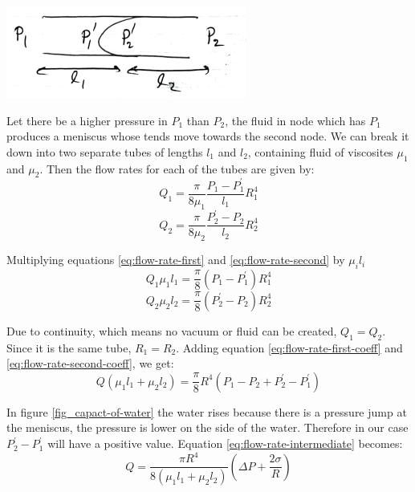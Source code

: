\documentclass[12pt, a4paper]{article}
\begin{document}
\includegraphics{fig_flowr-1-men}

Let there be a higher pressure in $P_{1}$ than $P_{2}$, the fluid in node which has $P_{1}$ produces a meniscus whose tends move towards the second node. We can break it down into two separate tubes of lengths $l_{1}$ and $l_{2}$, containing fluid of viscosites ${\mu}_1$ and ${\mu}_2$. Then the flow rates for each of the tubes are given by:
\begin{equation} \label{eq:flow-rate-first}
Q_1 = \frac{\pi}{8{\mu}_1} \frac{P_1 - P^{'}_1}{l_1} R_1^4
\end{equation}
\begin{equation} \label{eq:flow-rate-second}
Q_2 = \frac{\pi}{8{\mu}_2} \frac{P^{'}_2 - P_2}{l_2} R_2^4
\end{equation}

Multiplying equations \ref{eq:flow-rate-first} and \ref{eq:flow-rate-second} by ${\mu}_i l_i$
\begin{equation} \label{eq:flow-rate-first-coeff}
Q_1 {\mu}_1 l_1 = \frac{\pi}{8} (P_1 - P^{'}_1) R_1^4
\end{equation}
\begin{equation} \label{eq:flow-rate-second-coeff}
Q_2 {\mu}_2 l_2 = \frac{\pi}{8} (P^{'}_2 - P_2) R_2^4
\end{equation}

Due to continuity, which means no vacuum or fluid can be created, $Q_1 = Q_2$. Since it is the same tube, $R_1 = R_2$. Adding equation \ref{eq:flow-rate-first-coeff} and \ref{eq:flow-rate-second-coeff}, we get:
\begin{equation} \label{eq:flow-rate-intermediate}
Q({\mu}_1 l_1 + {\mu}_2 l_2) = \frac{\pi}{8}R^4(P_1 - P_2 + P^{'}_2 - P^{'}_1)
\end{equation}

In figure \ref{fig_capact-of-water} the water rises because there is a pressure jump at the meniscus, the pressure is lower on the side of the water. Therefore in our case $P^{'}_2 - P^{'}_1$ will have a positive value. Equation \ref{eq:flow-rate-intermediate} becomes:
\begin{equation}
Q = \frac{\pi R^4}{8({\mu}_1 l_1 + {\mu}_2 l_2)}(\Delta P + \frac{2\sigma}{R})
\end{equation}
\end{document}
